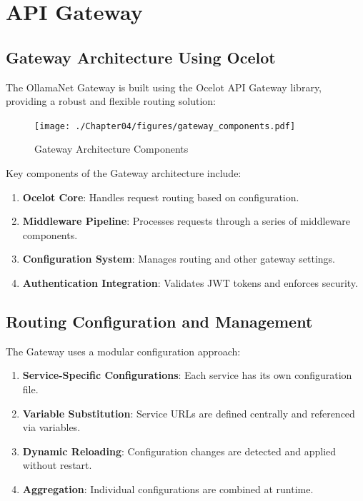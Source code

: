 \section{API Gateway}

\subsection{Gateway Architecture Using Ocelot}

The OllamaNet Gateway is built using the Ocelot API Gateway library, providing a robust and flexible routing solution:

\begin{figure}
    \centering
    \texttt{[image: ./Chapter04/figures/gateway\_components.pdf]}
    \caption{Gateway Architecture Components}
    \label{fig:gateway-components}
\end{figure}
\clearpage

Key components of the Gateway architecture include:

\begin{enumerate}
   \item \textbf{Ocelot Core}: Handles request routing based on configuration.
   \item \textbf{Middleware Pipeline}: Processes requests through a series of middleware components.
   \item \textbf{Configuration System}: Manages routing and other gateway settings.
   \item \textbf{Authentication Integration}: Validates JWT tokens and enforces security.
\end{enumerate}

\subsection{Routing Configuration and Management}

The Gateway uses a modular configuration approach:

\begin{enumerate}
   \item \textbf{Service-Specific Configurations}: Each service has its own configuration file.
   \item \textbf{Variable Substitution}: Service URLs are defined centrally and referenced via variables.
   \item \textbf{Dynamic Reloading}: Configuration changes are detected and applied without restart.
   \item \textbf{Aggregation}: Individual configurations are combined at runtime.
\end{enumerate}

